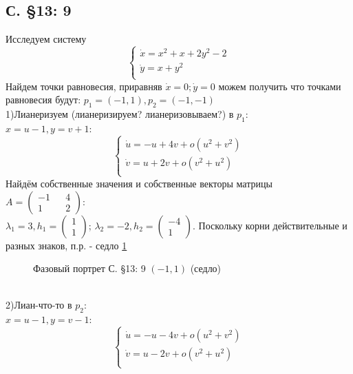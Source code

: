 \documentclass{article}
\begin{document}
\subsection{С. \S13: 9}
Исследуем систему 
\begin{equation}
\begin{cases}
        \dot{x}=x^2+x+2y^2-2\\
        \dot{y}=x+y^2\\
    \end{cases}    
\end{equation}
Найдем точки равновесия, приравняв $\dot{x}=0; \dot{y}=0$ можем получить что точками равновесия будут: $p_1=(-1,1),p_2=(-1,-1)$\\
1)Лианеризуем (лианеризируем? лианеризовываем?) в $p_1$:\\
$x=u-1,y=v+1$:
\begin{equation}
\begin{cases}
        \dot{u}=-u+4v+o(u^2+v^2)\\
        \dot{v}=u+2v+o(v^2+u^2)\\
    \end{cases}    
\end{equation}
Найдём собственные значения и собственные векторы матрицы $A=\begin{pmatrix}-1 && 4 \\ 1 && 2 \end{pmatrix}$:\\
 $\lambda_1=3,
 h_1 = \begin{pmatrix} 1  \\  1 \end{pmatrix} $; 
 $\lambda_2= -2,
 h_2 = \begin{pmatrix} -4  \\  1 \end{pmatrix} $. 
 Поскольку корни действительные и разных знаков, п.р. - седло \ref{13.9.1}
 \begin{figure}[ht]
\caption{Фазовый портрет С. \S13: 9 $(-1,1)$ (седло)}
\label{13.9.1}
\end{figure}\\
2)Лиан-что-то в $p_2$:\\
$x=u-1,y=v-1$:
\begin{equation}
\begin{cases}
        \dot{u}=-u-4v+o(u^2+v^2)\\
        \dot{v}=u-2v+o(v^2+u^2)\\
    \end{cases}    
\end{equation}
\end{document}

